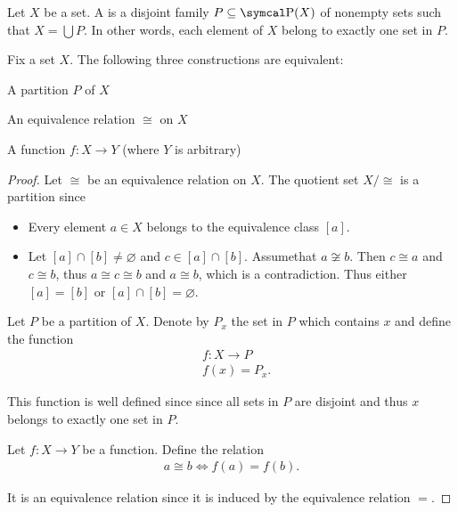 \begin{definition}\label{def:set_partition}
  Let \( X \) be a set. A  is a disjoint family \( P \subseteq \Power(X) \) of nonempty sets such that \( X = \bigcup P \). In other words, each element of \( X \) belong to exactly one set in \( P \).
\end{definition}

\begin{proposition}\label{thm:equivalence_partition}
  Fix a set \( X \). The following three constructions are equivalent:
  \begin{defenum}
    \item\label{thm:equivalence_partition/partition} A partition \( P \) of \( X \)
    \item\label{thm:equivalence_partition/equivalence} An equivalence relation \( \cong \) on \( X \)
    \item\label{thm:equivalence_partition/function} A function \( f: X \to Y \) (where \( Y \) is arbitrary)
  \end{defenum}
\end{proposition}
\begin{proof}
   Let \( \cong \) be an equivalence relation on \( X \). The quotient set \( X / \cong \) is a partition since
  \begin{itemize}
    \item Every element \( a \in X \) belongs to the equivalence class \( [a] \).
    \item Let \( [a] \cap [b] \neq \varnothing \) and \( c \in [a] \cap [b] \). Assume\LEM that \( a \not\cong b \). Then \( c \cong a \) and \( c \cong b \), thus \( a \cong c \cong b \) and \( a \cong b \), which is a contradiction. Thus either \( [a] = [b] \) or \( [a] \cap [b] = \varnothing \).
  \end{itemize}

   Let \( P \) be a partition of \( X \). Denote by \( P_x \) the set in \( P \) which contains \( x \) and define the function
  \begin{align*}
    &f: X \to P \\
    &f(x) = P_x.
  \end{align*}

  This function is well defined since since all sets in \( P \) are disjoint and thus \( x \) belongs to exactly one set in \( P \).

   Let \( f: X \to Y \) be a function. Define the relation
  \begin{align*}
    a \cong b \iff f(a) = f(b).
  \end{align*}

  It is an equivalence relation since it is induced by the equivalence relation \( = \).
\end{proof}

